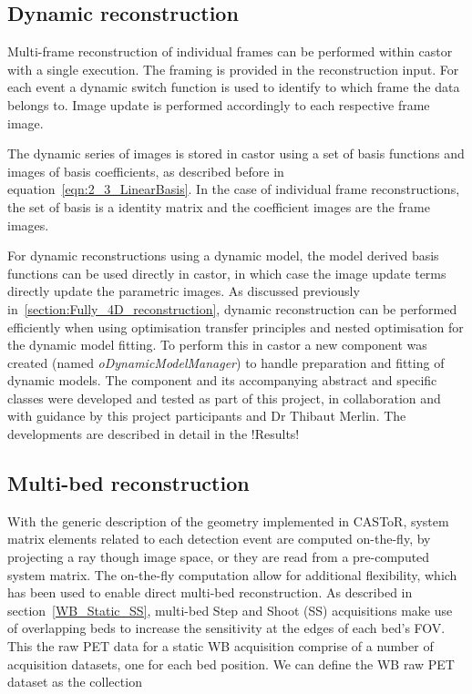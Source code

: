 \subsection{Dynamic reconstruction}
Multi-frame reconstruction of individual frames can be performed within \gls{castor} with a single execution. The framing is provided in the reconstruction input. For each event a dynamic switch function is used to identify to which frame the data belongs to. Image update is performed accordingly to each respective frame image.

The dynamic series of images is stored in \gls{castor} using a set of basis functions and images of basis coefficients, as described before in equation~\ref{eqn:2_3_LinearBasis}. 
In the case of individual frame reconstructions, the set of basis is a identity matrix and the coefficient images are the frame images. 

For dynamic reconstructions using a dynamic model, the model derived basis functions can be used directly in \gls{castor}, in which case the image update terms directly update the parametric images.
As discussed previously in~\autoref{section:Fully_4D_reconstruction}, dynamic reconstruction can be performed efficiently when using optimisation transfer principles and nested optimisation for the dynamic model fitting. 
To perform this in \gls{castor} a new component was created (named \textit{oDynamicModelManager}) to handle preparation and fitting of dynamic models. The component and its accompanying abstract and specific classes were developed and tested as part of this project, in collaboration and with guidance by this project participants and Dr Thibaut Merlin.
The developments are described in detail in the !Results! 

\subsection{Multi-bed reconstruction}

With the generic description of the geometry implemented in CASToR, system matrix elements related to each detection event are computed on-the-fly, by projecting a ray though image space, or they are read from a pre-computed system matrix. 
The on-the-fly computation allow for additional flexibility, which has been used to enable direct multi-bed reconstruction. 
As described in section~\ref{WB_Static_SS}, multi-bed Step and Shoot (SS) acquisitions make use of overlapping beds to increase the sensitivity at the edges of each bed's FOV. This the raw PET data for a static WB acquisition comprise of a number of acquisition datasets, one for each bed position. We can define the WB raw PET dataset as the collection

